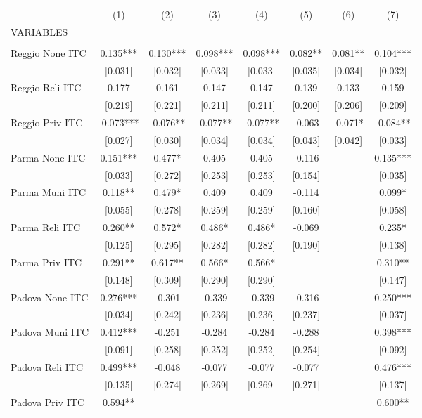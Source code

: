 \begin{tabular}{lccccccc} \hline
 & (1) & (2) & (3) & (4) & (5) & (6) & (7) \\
VARIABLES &  &  &  &  &  &  &  \\ \hline
 &  &  &  &  &  &  &  \\
Reggio None ITC & 0.135*** & 0.130*** & 0.098*** & 0.098*** & 0.082** & 0.081** & 0.104*** \\
 & [0.031] & [0.032] & [0.033] & [0.033] & [0.035] & [0.034] & [0.032] \\
Reggio Reli ITC & 0.177 & 0.161 & 0.147 & 0.147 & 0.139 & 0.133 & 0.159 \\
 & [0.219] & [0.221] & [0.211] & [0.211] & [0.200] & [0.206] & [0.209] \\
Reggio Priv ITC & -0.073*** & -0.076** & -0.077** & -0.077** & -0.063 & -0.071* & -0.084** \\
 & [0.027] & [0.030] & [0.034] & [0.034] & [0.043] & [0.042] & [0.033] \\
Parma None ITC & 0.151*** & 0.477* & 0.405 & 0.405 & -0.116 &  & 0.135*** \\
 & [0.033] & [0.272] & [0.253] & [0.253] & [0.154] &  & [0.035] \\
Parma Muni ITC & 0.118** & 0.479* & 0.409 & 0.409 & -0.114 &  & 0.099* \\
 & [0.055] & [0.278] & [0.259] & [0.259] & [0.160] &  & [0.058] \\
Parma Reli ITC & 0.260** & 0.572* & 0.486* & 0.486* & -0.069 &  & 0.235* \\
 & [0.125] & [0.295] & [0.282] & [0.282] & [0.190] &  & [0.138] \\
Parma Priv ITC & 0.291** & 0.617** & 0.566* & 0.566* &  &  & 0.310** \\
 & [0.148] & [0.309] & [0.290] & [0.290] &  &  & [0.147] \\
Padova None ITC & 0.276*** & -0.301 & -0.339 & -0.339 & -0.316 &  & 0.250*** \\
 & [0.034] & [0.242] & [0.236] & [0.236] & [0.237] &  & [0.037] \\
Padova Muni ITC & 0.412*** & -0.251 & -0.284 & -0.284 & -0.288 &  & 0.398*** \\
 & [0.091] & [0.258] & [0.252] & [0.252] & [0.254] &  & [0.092] \\
Padova Reli ITC & 0.499*** & -0.048 & -0.077 & -0.077 & -0.077 &  & 0.476*** \\
 & [0.135] & [0.274] & [0.269] & [0.269] & [0.271] &  & [0.137] \\
Padova Priv ITC & 0.594** &  &  &  &  &  & 0.600** \\

\end{tabular}
